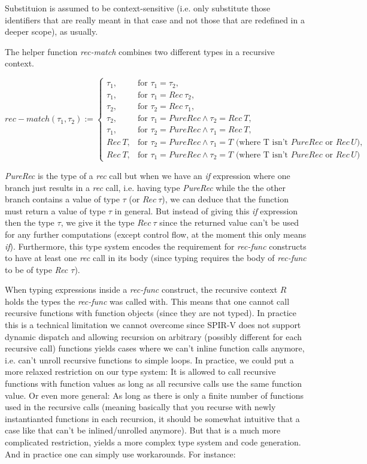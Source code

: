 \documentclass[letterpaper,12pt]{article}
\begin{document}
Substituion is assumed to be context-sensitive (i.e. only substitute those
identifiers that are really meant in that case and not those that are
redefined in a deeper scope), as usually.

The helper function \textit{rec-match} combines two different types in a
recursive context. 

\[
	rec-match(\tau_1, \tau_2) := 
	\begin{cases}
		\tau_1, & \text{for } \tau_1 = \tau_2, \\
		\tau_1, & \text{for } \tau_1 = Rec\:\tau_2, \\
		\tau_2, & \text{for } \tau_2 = Rec\:\tau_1, \\
		\tau_2, & \text{for } \tau_1 = PureRec \land \tau_2 = Rec\:T, \\
		\tau_1, & \text{for } \tau_2 = PureRec \land \tau_1 = Rec\: T, \\
		Rec\:T, &  \text{for } \tau_2 = PureRec \land \tau_1 = T \text{ (where T isn't $PureRec$ or $Rec\, U$)}, \\
		Rec\:T, &  \text{for } \tau_1 = PureRec \land \tau_2 = T \text{ (where T isn't $PureRec$ or $Rec\, U$)}
	\end{cases}
\]

\textit{PureRec} is the type of a \textit{rec} call but
when we have an \textit{if} expression where one branch just results
in a \textit{rec} call, i.e. having type \textit{PureRec} while the
the other branch contains a  value of type $\tau$ (or $Rec\: \tau$), we can deduce 
that the function must return a value of type $\tau$ in general.
But instead of giving this \textit{if} expression then the type $\tau$,
we give it the type $Rec\: \tau$ since the returned value can't be used
for any further computations (except control flow, at the moment this
only means \textit{if}). Furthermore, this type system encodes
the requirement for \textit{rec-func} constructs to have at least one
\textit{rec} call in its body (since typing requires the body of \textit{rec-func}
to be of type \textit{Rec $\tau$}).

When typing expressions inside a \textit{rec-func} construct, the recursive 
context $R$ holds the types the \textit{rec-func} was called with. This means
that one cannot call recursive functions with function objects (since they
are not typed). In practice
this is a technical limitation we cannot overcome since SPIR-V does not support
dynamic dispatch and allowing recursion on arbitrary (possibly different
for each recursive call) functions yields cases where we can't inline
function calls anymore, i.e. can't unroll recursive functions to simple loops.
In practice, we could put a more relaxed restriction on our type system:
It is allowed to call recursive functions with function values as long
as all recursive calls use the same function value. Or even more general:
As long as there is only a finite number of functions used in the
recursive calls (meaning basically that you recurse with newly
instantianted functions in each recursion, it should be somewhat intuitive
that a case like that can't be inlined/unrolled anymore). But that
is a much more complicated restriction, yields a more complex type system
and code generation. And in practice one can simply use workarounds.
For instance:
\end{document}
